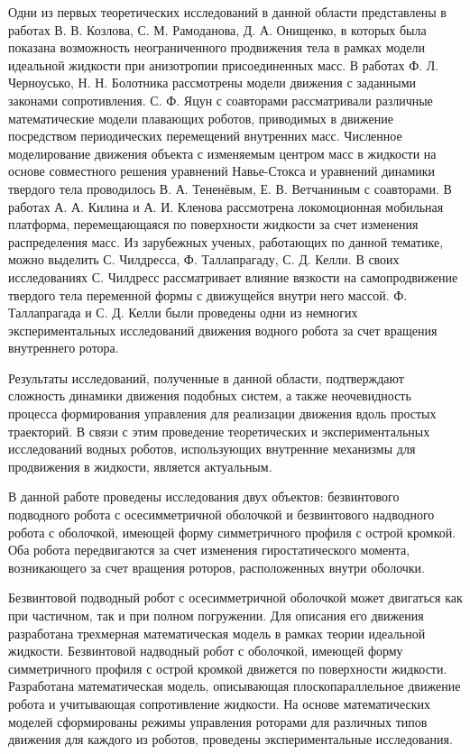 Одни из первых теоретических исследований в данной области представлены в работах В. В. Козлова, С. М. Рамоданова, Д. А. Онищенко, в которых была показана возможность неограниченного продвижения тела в рамках модели идеальной жидкости при анизотропии присоединенных масс. В работах Ф. Л. Черноусько, Н. Н. Болотника рассмотрены модели движения с заданными законами сопротивления. С. Ф. Яцун с соавторами рассматривали различные математические модели плавающих роботов, приводимых в движение посредством периодических перемещений внутренних масс. Численное моделирование движения объекта с изменяемым центром масс в жидкости на основе совместного решения уравнений Навье-Стокса и уравнений динамики твердого тела проводилось В. А. Тененёвым, Е. В. Ветчаниным с соавторами. В работах А. А. Килина и А. И. Кленова рассмотрена локомоционная мобильная платформа, перемещающаяся по поверхности жидкости за счет изменения распределения масс. Из зарубежных ученых, работающих по данной тематике, можно выделить С. Чилдресса, Ф. Таллапрагаду, С. Д. Келли. %
В своих исследованиях С. Чилдресс рассматривает влияние вязкости на самопродвижение твердого тела переменной формы с движущейся внутри него массой. Ф. Таллапрагада и С. Д. Келли были проведены одни из немногих экспериментальных исследований движения водного робота за счет вращения внутреннего ротора.  %

Результаты исследований, полученные в данной области, подтверждают сложность динамики движения подобных систем, а также неочевидность процесса формирования управления для реализации движения вдоль простых траекторий. В связи с этим проведение теоретических и экспериментальных исследований водных роботов, использующих внутренние механизмы для продвижения в жидкости, является актуальным.

В данной работе проведены исследования двух объектов: безвинтового подводного робота с осесимметричной оболочкой и безвинтового надводного робота с оболочкой, имеющей форму симметричного профиля с острой кромкой. Оба робота передвигаются за счет изменения гиростатического момента, возникающего за счет вращения роторов, расположенных внутри оболочки.
 
Безвинтовой подводный робот с осесимметричной оболочкой может двигаться как при частичном, так и при полном погружении. Для описания его движения разработана трехмерная математическая модель в рамках теории идеальной жидкости. Безвинтовой надводный робот с оболочкой, имеющей форму симметричного профиля с острой кромкой движется по поверхности жидкости. Разработана математическая модель, описывающая плоскопараллельное движение робота и учитывающая сопротивление жидкости. На основе математических моделей сформированы режимы управления роторами для различных типов движения для каждого из роботов, проведены экспериментальные исследования.




